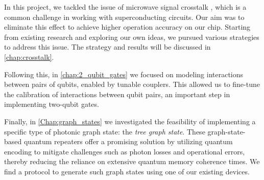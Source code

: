 In this project, we tackled the issue of microwave signal crosstalk \cite{Crosstalk_intro_1, crosstalk_intro_2, signal_crosstalk}, which is a common challenge in working with superconducting circuits.
Our aim was to eliminate this effect to achieve higher operation accuracy on our chip.
Starting from existing research \cite{crosstalk} and exploring our own ideas, we pursued various strategies to address this issue.
The strategy and results will be discussed in \cref{chap:crosstalk}.

Following this, in \cref{chap:2_qubit_gates} we focused on modeling interactions between pairs of qubits, enabled by tunable couplers.
This allowed us to fine-tune the calibration of interactions between qubit pairs, an important step in implementing two-qubit gates.

Finally, in \cref{Chap:graph_states} we investigated the feasibility of implementing a specific type of photonic graph state: the \emph{tree graph state}.
These graph-state-based quantum repeaters \cite{Why_tree_graph_state} offer a promising solution by utilizing quantum encoding to mitigate challenges such as photon losses and operational errors, thereby reducing the reliance on extensive quantum memory coherence times.
We find a protocol to generate such graph states using one of our existing devices.